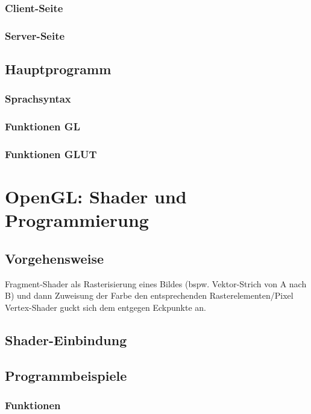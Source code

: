 \subsection{Client-Seite}
\subsection{Server-Seite}

\section{Hauptprogramm}
\subsection{Sprachsyntax}
\subsection{Funktionen GL}
\subsection{Funktionen GLUT}

\chapter{OpenGL: Shader und Programmierung}
\section{Vorgehensweise}
Fragment-Shader als Rasterisierung eines Bildes (bspw. Vektor-Strich von A nach B) und dann Zuweisung der Farbe den entsprechenden Rasterelementen/Pixel\\
Vertex-Shader guckt sich dem entgegen Eckpunkte an.
\section{Shader-Einbindung}
\section{Programmbeispiele}
\subsection{Funktionen}

